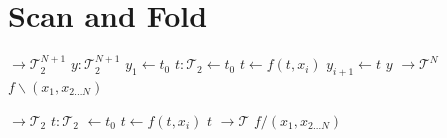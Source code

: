 \section{Scan and Fold}
\begin{algorithm}
    \caption{Scan operator for a binary function $f: \mathcal{T}_2 \times \mathcal{T}_1 \to \mathcal{T}_2$. The notation of using a backslash is borrowed from \citet{iverson62,iverson79}. Note that we prepend the initial value to the returned sequence. If $\mathcal{T}_1 = \mathcal{T}_2$, we take the first value of $x$ as the initial value.}
    \label{alg:scan}
    \begin{algorithmic}[1]
         $\to \mathcal{T}_2^{N+1}$
            \State $y: \mathcal{T}_2^{N+1}$
            \State $y_1 \gets t_0$
            \Statex
            \State $t: \mathcal{T}_2 \gets t_0$
                \State $t \gets f(t, x_i)$
                \State $y_{i+1} \gets t$
            \EndFor
            \Statex
            \State \Return $y$
        \EndFunction
        \Statex
         $\to \mathcal{T}^N$
            \State \Return $f\backslash(x_1, x_{2 \ldots N})$
        \EndFunction
    \end{algorithmic}
\end{algorithm}

\begin{algorithm}
    \caption{Fold operator for a binary function $f: \mathcal{T}_2 \times \mathcal{T}_1 \to \mathcal{T}_2$. The notation of using a slash is borrowed from \citet{iverson62,iverson79}. If $\mathcal{T}_1 = \mathcal{T}_2$, we take the first value of $x$ as the initial value.}
    \label{alg:fold}
    \begin{algorithmic}[1]
         $\to \mathcal{T}_2$
            \State $t: \mathcal{T}_2$ $\gets t_0$
                \State $t \gets f(t, x_i)$
            \EndFor
            \Statex
            \State \Return $t$
        \EndFunction
        \Statex
         $\to \mathcal{T}$
            \State \Return $f/(x_1, x_{2 \ldots N})$
        \EndFunction
    \end{algorithmic}
\end{algorithm}
